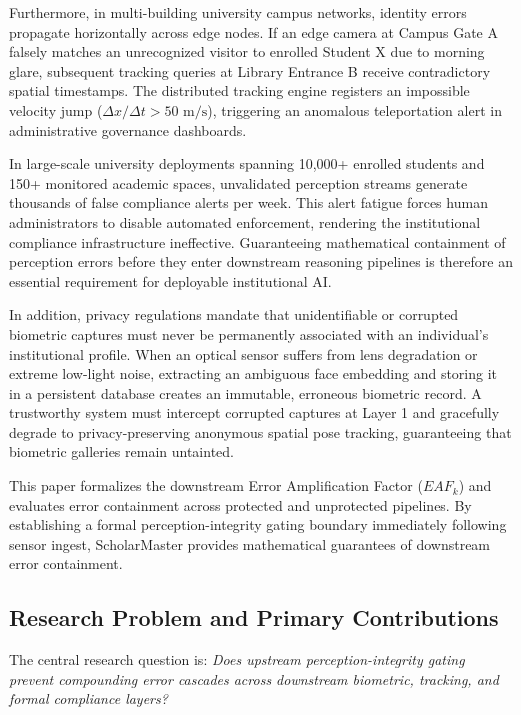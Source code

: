 \documentclass[conference]{IEEEtran}
\begin{document}
Furthermore, in multi-building university campus networks, identity errors propagate horizontally across edge nodes. If an edge camera at Campus Gate A falsely matches an unrecognized visitor to enrolled Student X due to morning glare, subsequent tracking queries at Library Entrance B receive contradictory spatial timestamps. The distributed tracking engine registers an impossible velocity jump ($\Delta x / \Delta t > 50\text{ m/s}$), triggering an anomalous teleportation alert in administrative governance dashboards.

In large-scale university deployments spanning 10,000+ enrolled students and 150+ monitored academic spaces, unvalidated perception streams generate thousands of false compliance alerts per week. This alert fatigue forces human administrators to disable automated enforcement, rendering the institutional compliance infrastructure ineffective. Guaranteeing mathematical containment of perception errors before they enter downstream reasoning pipelines is therefore an essential requirement for deployable institutional AI.

In addition, privacy regulations mandate that unidentifiable or corrupted biometric captures must never be permanently associated with an individual's institutional profile. When an optical sensor suffers from lens degradation or extreme low-light noise, extracting an ambiguous face embedding and storing it in a persistent database creates an immutable, erroneous biometric record. A trustworthy system must intercept corrupted captures at Layer 1 and gracefully degrade to privacy-preserving anonymous spatial pose tracking, guaranteeing that biometric galleries remain untainted.

This paper formalizes the downstream Error Amplification Factor ($EAF_k$) and evaluates error containment across protected and unprotected pipelines. By establishing a formal perception-integrity gating boundary immediately following sensor ingest, ScholarMaster provides mathematical guarantees of downstream error containment.

\subsection{Research Problem and Primary Contributions}
The central research question is: \textit{Does upstream perception-integrity gating prevent compounding error cascades across downstream biometric, tracking, and formal compliance layers?}
\end{document}
